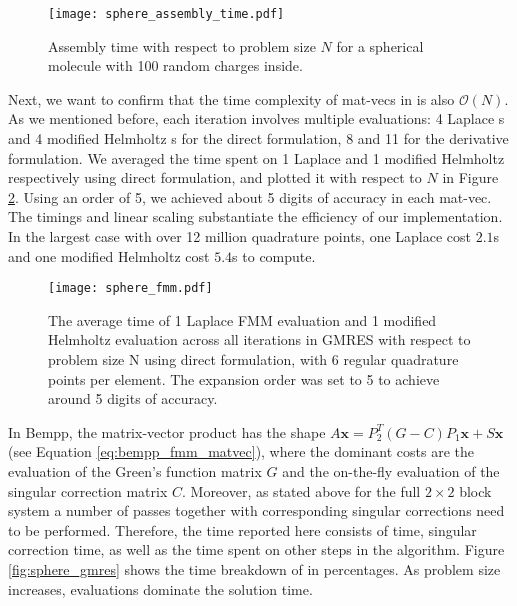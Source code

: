 \begin{figure}%
    \centering
    \texttt{[image: sphere\_assembly\_time.pdf]} 
    \caption{Assembly time with respect to problem size $N$ for a spherical molecule with 100 random charges inside.}
    \label{fig:sphere_assembly_time}
\end{figure}

Next, we want to confirm that the time complexity of mat-vecs in \gmres is also $\mathcal{O}(N)$.
As we mentioned before, each iteration involves multiple \fmm evaluations: 4 Laplace {\fmm}s and 4 modified Helmholtz {\fmm}s for the direct formulation, 8 and 11 for the derivative formulation.
We averaged the time spent on 1 Laplace \fmm and 1 modified Helmholtz \fmm respectively using direct formulation, and plotted it with respect to $N$ in Figure \ref{fig:sphere_fmm}.
Using an \fmm order of 5, we achieved about 5 digits of accuracy in each mat-vec.
The timings and linear scaling substantiate the efficiency of our \fmm implementation.
In the largest case with over 12 million quadrature points, one Laplace \fmm cost $2.1$s and one modified Helmholtz \fmm cost $5.4$s to compute.

\begin{figure}%
    \centering
    \texttt{[image: sphere\_fmm.pdf]} 
    \caption{The average time of 1 Laplace FMM evaluation and 1 modified Helmholtz evaluation across all iterations in GMRES with respect to problem size N using direct formulation, with 6 regular quadrature points per element.
    The \fmm expansion order was set to 5 to achieve around 5 digits of accuracy.
    }
    \label{fig:sphere_fmm}
\end{figure}

In Bempp, the matrix-vector product has the shape $A\mathbf{x} = P_2^T (G - C)P_1 \mathbf{x} + S \mathbf{x}$ (see Equation \ref{eq:bempp_fmm_matvec}), where the dominant costs are the \fmm evaluation of the Green's function matrix $G$ and the on-the-fly evaluation of the singular correction matrix $C$. Moreover, as stated above for the full $2\times 2$ block system a number of \fmm passes together with corresponding singular corrections need to be performed.
Therefore, the \gmres time reported here consists of \fmm time, singular correction time, as well as the time spent on other steps in the \gmres algorithm.
Figure \ref{fig:sphere_gmres} shows the time breakdown of \gmres in percentages.
As problem size increases, \fmm evaluations dominate the solution time.

